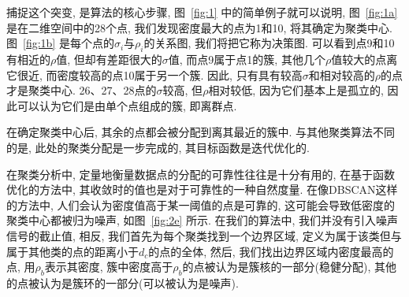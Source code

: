 捕捉这个突变, 是算法的核心步骤, 图~\ref{fig:1} 中的简单例子就可以说明, 图~\ref{fig:1a} 是在二维空间中的28个点, 我们发现密度最大的点为1和10, 将其确定为聚类中心. 图~\ref{fig:1b} 是每个点的$\sigma_i$与$\rho_i$的关系图, 我们将把它称为决策图. 可以看到点9和10有相近的$\rho$值, 但却有差距很大的$\sigma$值, 而点9属于点1的簇, 其他几个$\rho$值较大的点离它很近, 而密度较高的点10属于另一个簇. 因此, 只有具有较高$\sigma$和相对较高的$\rho$的点才是聚类中心. 26、27、28点的$\sigma$较高, 但$\rho$相对较低, 因为它们基本上是孤立的, 因此可以认为它们是由单个点组成的簇, 即离群点. 

在确定聚类中心后, 其余的点都会被分配到离其最近的簇中. 与其他聚类算法不同的是, 此处的聚类分配是一步完成的, 其目标函数是迭代优化的\cite{MacQueen1967,McLachlan2007}. 

在聚类分析中, 定量地衡量数据点的分配的可靠性往往是十分有用的, 在基于函数优化的方法中\cite{MacQueen1967,McLachlan2007}, 其收敛时的值也是对于可靠性的一种自然度量. 在像DBSCAN\cite{Ester1996}这样的方法中, 人们会认为密度值高于某一阈值的点是可靠的, 这可能会导致低密度的聚类中心都被归为噪声, 如图~\ref{fig:2e} 所示. 在我们的算法中, 我们并没有引入噪声信号的截止值, 相反, 我们首先为每个聚类找到一个边界区域, 定义为属于该类但与属于其他类的点的距离小于$d_c$的点的全体, 然后, 我们找出边界区域内密度最高的点, 用$\rho_b$表示其密度, 簇中密度高于$\rho_b$的点被认为是簇核的一部分(稳健分配), 其他的点被认为是簇环的一部分(可以被认为是噪声). 
